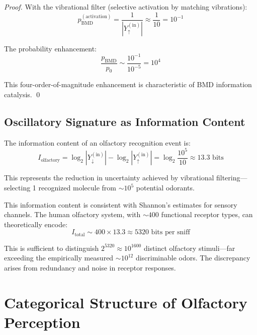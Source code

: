 \begin{proof}
With the vibrational filter (selective activation by matching vibrations):
\begin{equation}
p_{\text{BMD}}^{(\text{activation})} = \frac{1}{|Y_{\uparrow}^{(\text{in})}|} \approx \frac{1}{10} = 10^{-1}
\end{equation}

The probability enhancement:
\begin{equation}
\frac{p_{\text{BMD}}}{p_0} \sim \frac{10^{-1}}{10^{-5}} = 10^4
\end{equation}

This four-order-of-magnitude enhancement is characteristic of BMD information catalysis. \qed
\end{proof}

\subsection{Oscillatory Signature as Information Content}

\begin{definition}
\label{def:olfactory_information}
The information content of an olfactory recognition event is:
\begin{equation}
I_{\text{olfactory}} = \log_2 |Y_{\downarrow}^{(\text{in})}| - \log_2 |Y_{\uparrow}^{(\text{in})}| = \log_2 \frac{10^5}{10} \approx 13.3 \text{ bits}
\end{equation}

This represents the reduction in uncertainty achieved by vibrational filtering—selecting 1 recognized molecule from $\sim 10^5$ potential odorants.
\end{definition}

\begin{remark}
This information content is consistent with Shannon's estimates for sensory channels. The human olfactory system, with $\sim 400$ functional receptor types, can theoretically encode:
\begin{equation}
I_{\text{total}} \sim 400 \times 13.3 \approx 5320 \text{ bits per sniff}
\end{equation}

This is sufficient to distinguish $2^{5320} \approx 10^{1600}$ distinct olfactory stimuli—far exceeding the empirically measured $\sim 10^{12}$ discriminable odors. The discrepancy arises from redundancy and noise in receptor responses.
\end{remark}

\section{Categorical Structure of Olfactory Perception}


